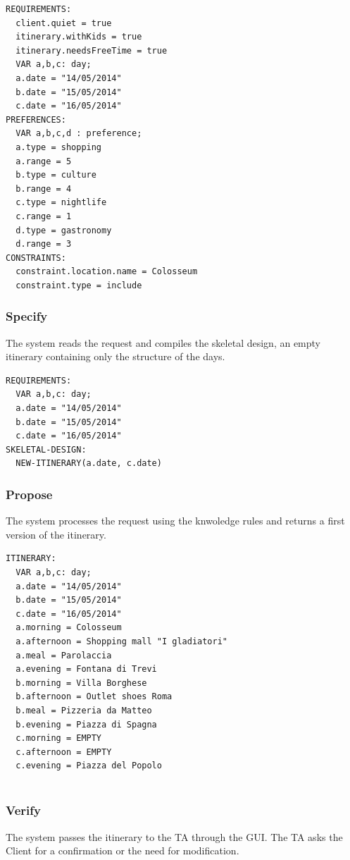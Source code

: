 \documentclass[11pt]{article} %
\begin{document}
\begin{lstlisting}[breaklines=true,mathescape=true]
REQUIREMENTS:
  client.quiet = true
  itinerary.withKids = true
  itinerary.needsFreeTime = true
  VAR a,b,c: day;
  a.date = "14/05/2014"
  b.date = "15/05/2014"
  c.date = "16/05/2014"
PREFERENCES:
  VAR a,b,c,d : preference;
  a.type = shopping
  a.range = 5
  b.type = culture
  b.range = 4
  c.type = nightlife
  c.range = 1
  d.type = gastronomy
  d.range = 3
CONSTRAINTS:
  constraint.location.name = Colosseum
  constraint.type = include
\end{lstlisting}

\subsubsection{Specify}
The system reads the request and compiles the skeletal design, an empty itinerary containing only the structure of the days.

\begin{lstlisting}[breaklines=true,mathescape=true]
REQUIREMENTS:
  VAR a,b,c: day;
  a.date = "14/05/2014"
  b.date = "15/05/2014"
  c.date = "16/05/2014"
SKELETAL-DESIGN:
  NEW-ITINERARY(a.date, c.date)
\end{lstlisting}

\subsubsection{Propose}
The system processes the request using the knwoledge rules and returns a first version of the itinerary.

\begin{lstlisting}[breaklines=true,mathescape=true]
ITINERARY:
  VAR a,b,c: day;
  a.date = "14/05/2014"
  b.date = "15/05/2014"
  c.date = "16/05/2014"
  a.morning = Colosseum
  a.afternoon = Shopping mall "I gladiatori"
  a.meal = Parolaccia
  a.evening = Fontana di Trevi
  b.morning = Villa Borghese
  b.afternoon = Outlet shoes Roma
  b.meal = Pizzeria da Matteo
  b.evening = Piazza di Spagna
  c.morning = EMPTY
  c.afternoon = EMPTY 
  c.evening = Piazza del Popolo
  
\end{lstlisting}

\subsubsection{Verify}
The system passes the itinerary to the TA through the GUI. The TA asks the Client for a confirmation or the need for modification.
\end{document}
